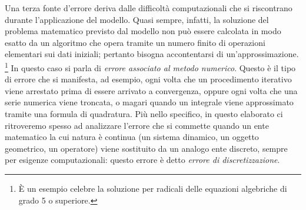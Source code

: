 Una terza fonte d'errore deriva dalle difficoltà computazionali
che si riscontrano durante l'applicazione del modello.
Quasi sempre, infatti, la soluzione del problema matematico
previsto dal modello non può essere calcolata in modo esatto
da un algoritmo che opera tramite un numero finito di operazioni elementari
sui dati iniziali; pertanto bisogna accontentarsi di
un'approssimazione.%
\footnote{È un esempio celebre la soluzione per radicali
delle equazioni algebriche di grado 5 o superiore.}
In questo caso si parla di \emph{errore associato
al metodo numerico}. Questo è il tipo di errore che si manifesta,
ad esempio, ogni volta che un procedimento iterativo viene
arrestato prima di essere arrivato a convergenza, oppure
ogni volta che una serie numerica viene troncata, o magari quando
un integrale viene approssimato tramite una formula di quadratura.
Più nello specifico, in questo elaborato ci ritroveremo spesso ad analizzare
l'errore che si commette quando un ente matematico la cui natura è continua
(un sistema dinamico, un oggetto geometrico, un operatore) viene sostituito
da un analogo ente discreto, sempre per esigenze computazionali: questo errore
è detto \emph{errore di discretizzazione}.

